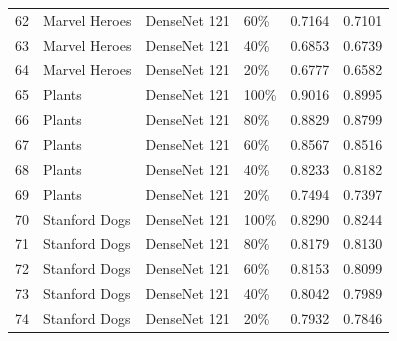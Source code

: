 \begin{longtable}{|l|l|l|l|r|r|}
62 &         Marvel Heroes &      DenseNet 121 &        60\% &  0.7164 &  0.7101 \\
63 &         Marvel Heroes &      DenseNet 121 &        40\% &  0.6853 &  0.6739 \\
64 &         Marvel Heroes &      DenseNet 121 &        20\% &  0.6777 &  0.6582 \\\hline
65 &     Plants &      DenseNet 121 &       100\% &  0.9016 &  0.8995 \\
66 &     Plants &      DenseNet 121 &        80\% &  0.8829 &  0.8799 \\
67 &     Plants &      DenseNet 121 &        60\% &  0.8567 &  0.8516 \\
68 &     Plants &      DenseNet 121 &        40\% &  0.8233 &  0.8182 \\
69 &     Plants &      DenseNet 121 &        20\% &  0.7494 &  0.7397 \\\hline
70 &  Stanford Dogs &      DenseNet 121 &       100\% &  0.8290 &  0.8244 \\
71 &  Stanford Dogs &      DenseNet 121 &        80\% &  0.8179 &  0.8130 \\
72 &  Stanford Dogs &      DenseNet 121 &        60\% &  0.8153 &  0.8099 \\
73 &  Stanford Dogs &      DenseNet 121 &        40\% &  0.8042 &  0.7989 \\
74 &  Stanford Dogs &      DenseNet 121 &        20\% &  0.7932 &  0.7846 \\\hline
\end{longtable}